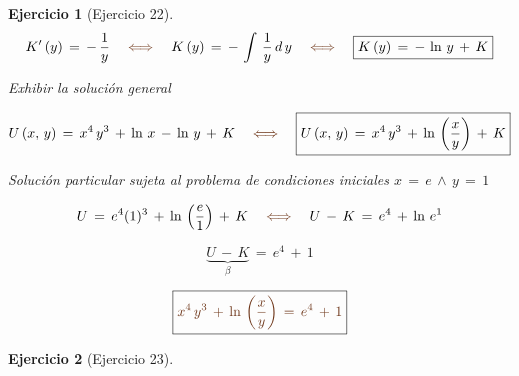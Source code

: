 \documentclass[a4paper,11pt]{book}
\newtheorem{ejer}{Ejercicio}[section]
\begin{document}
\begin{ejer}[Ejercicio 22]
  

$$K'\,(y)\,=\,-\,\dfrac{1}{y} \quad \textcolor{auburn}{\iff} \quad K\,(y)\,=\,-\,\int\,\dfrac{1}{y}\,d\,y \quad \textcolor{auburn}{\iff} \quad \boxed{K\,(y)\,=\,-\,\ln\,y\,+\,K}$$ 

  

 Exhibir la solución general  

  

$$U\,(x,\,y)\,=\,x^{4}\,y^{3}\,+\,\ln\,x\,-\,\ln\,y\,+\,K \quad \textcolor{auburn}{\iff} \quad \boxed{U\,(x,\,y)\,=\,x^{4}\,y^{3}\,+\,\ln\,\left(\dfrac{x}{y} \right)\,+\,K }$$ 

  

 Solución particular sujeta al problema de condiciones iniciales $\boxed{x\,=\,e \, \wedge \, y\,=\,1}$ 

  

$$U\,=\,e^{4}(1)^{3}\,+\,\ln\,\left(\dfrac{e}{1} \right)\,+\,K \quad \textcolor{auburn}{\iff} \quad U\,-\,K\,=\,e^{4}\,+\,\ln\,e^{1}$$ 

  

$$\underbrace{U\,-\,K}_{\beta}\,=\,e^{4}\,+\,1$$ 

  

$$\boxed{\textcolor{auburn}{x^{4}\,y^{3}\,+\,\ln\,\left(\dfrac{x}{y} \right)\,=\,e^{4}\,+\,1}} $$ 


\end{ejer} 

  

\begin{ejer}[Ejercicio 23] 

  

\end{ejer} 

  
\end{document}

